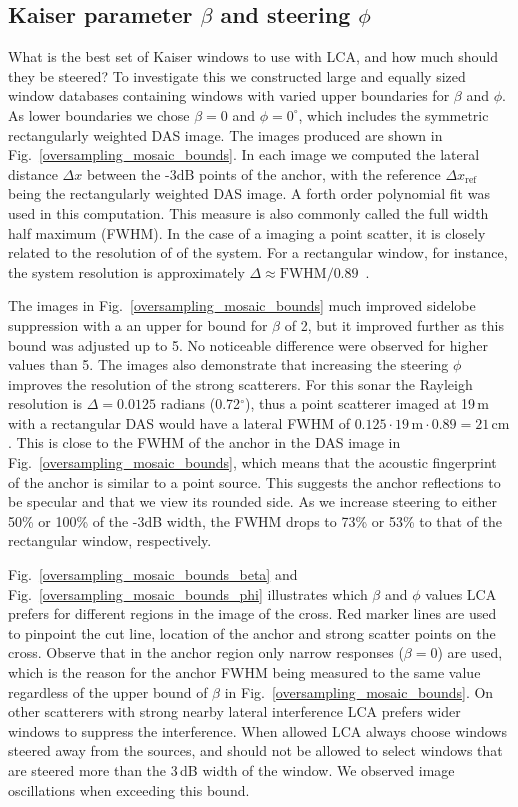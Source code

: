 \documentclass[10pt,journal,draftclsnofoot,onecolumn]{IEEEtran}
\newcommand\Fig[1]{Fig.~\ref{#1}}
\newcommand\1{\vec 1}
\begin{document}
\subsection{Kaiser parameter $\beta$ and steering $\phi$}\label{lca_kaiser_parameters}

What is the best set of Kaiser windows to use with LCA, and how much should they be steered? To investigate this we constructed large and equally sized window databases containing windows with varied upper boundaries for $\beta$ and $\phi$. As lower boundaries we chose $\beta=0$ and $\phi=0^\circ$, which includes the symmetric rectangularly weighted DAS image. The images produced are shown in \Fig{oversampling_mosaic_bounds}. In each image we computed the lateral distance $\Delta x$ between the -3dB points of the anchor, with the reference $\Delta x_\text{ref}$ being the rectangularly weighted DAS image. A forth order polynomial fit was used in this computation. This measure is also commonly called the full width half maximum (FWHM). In the case of a imaging a point scatter, it is closely related to the resolution of of the system. For a rectangular window, for instance, the system resolution is approximately $\Delta \approx \text{FWHM}/0.89$~\cite{Harris1978}.

The images in \Fig{oversampling_mosaic_bounds} much improved sidelobe suppression with a an upper for bound for $\beta$ of 2, but it improved further as this bound was adjusted up to 5. No noticeable difference were observed for higher values than 5. The images also demonstrate that increasing the steering $\phi$ improves the resolution of the strong scatterers. For this sonar the Rayleigh resolution is $\Delta=0.0125$ radians (0.72$^\circ$), thus a point scatterer imaged at 19\,m with a rectangular DAS would have a lateral FWHM of $0.125\cdot19\,\text{m}\cdot0.89=21\,\text{cm}$. This is close to the FWHM of the anchor in the DAS image in \Fig{oversampling_mosaic_bounds}, which means that the acoustic fingerprint of the anchor is similar to a point source. This suggests the anchor reflections to be specular and that we view its rounded side. As we increase steering to either 50\% or 100\% of the -3dB width, the FWHM drops to 73\% or 53\% to that of the rectangular window, respectively.

\Fig{oversampling_mosaic_bounds_beta} and \Fig{oversampling_mosaic_bounds_phi} illustrates which $\beta$ and $\phi$ values LCA prefers for different regions in the image of the cross. Red marker lines are used to pinpoint the cut line, location of the anchor and strong scatter points on the cross. Observe that in the anchor region only narrow responses ($\beta=0$) are used, which is the reason for the anchor FWHM being measured to the same value regardless of the upper bound of $\beta$ in \Fig{oversampling_mosaic_bounds}. On other scatterers with strong nearby lateral interference LCA prefers wider windows to suppress the interference. When allowed LCA always choose windows steered away from the sources, and should not be allowed to select windows that are steered more than the 3\,dB width of the window. We observed image oscillations when exceeding this bound. 
\end{document}
